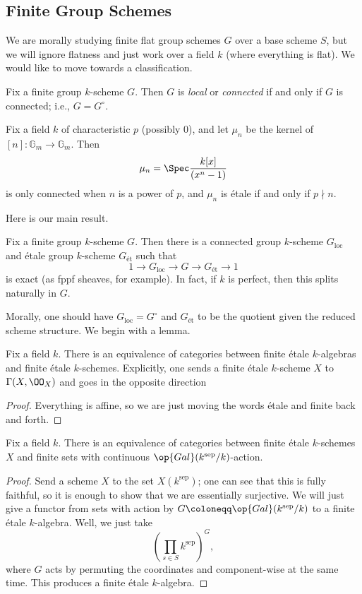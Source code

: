 \documentclass[../notes.tex]{subfiles}
\begin{document}
\subsection{Finite Group Schemes}
We are morally studying finite flat group schemes $G$ over a base scheme $S$, but we will ignore flatness and just work over a field $k$ (where everything is flat). We would like to move towards a classification.
\begin{definition}[connected]
	Fix a finite group $k$-scheme $G$. Then $G$ is \textit{local} or \textit{connected} if and only if $G$ is connected; i.e., $G=G^\circ$.
\end{definition}
\begin{example}
	Fix a field $k$ of characteristic $p$ (possibly $0$), and let $\mu_n$ be the kernel of $[n]\colon\mathbb G_m\to\mathbb G_m$. Then
	\[\mu_n=\Spec\frac{k[x]}{\left(x^n-1\right)}\]
	is only connected when $n$ is a power of $p$, and $\mu_n$ is \'etale if and only if $p\nmid n$.
\end{example}
Here is our main result.
\begin{proposition} \label{prop:split-finite-group-scheme}
	Fix a finite group $k$-scheme $G$. Then there is a connected group $k$-scheme $G_{\text{loc}}$ and \'etale group $k$-scheme $G_{\text{\'et}}$ such that
	\[1\to G_{\text{loc}}\to G\to G_{\text{\'et}}\to1\]
	is exact (as fppf sheaves, for example). In fact, if $k$ is perfect, then this splits naturally in $G$.
\end{proposition}
Morally, one should have $G_{\text{loc}}=G^\circ$ and $G_{\text{\'et}}$ to be the quotient given the reduced scheme structure. We begin with a lemma.
\begin{lemma}
	Fix a field $k$. There is an equivalence of categories between finite \'etale $k$-algebras and finite \'etale $k$-schemes. Explicitly, one sends a finite \'etale $k$-scheme $X$ to $\Gamma(X,\OO_X)$ and goes in the opposite direction
\end{lemma}
\begin{proof}
	Everything is affine, so we are just moving the words \'etale and finite back and forth.
\end{proof}
\begin{lemma}
	Fix a field $k$. There is an equivalence of categories between finite \'etale $k$-schemes $X$ and finite sets with continuous $\op{Gal}(k^{\mathrm{sep}}/k)$-action.
\end{lemma}
\begin{proof}
	Send a scheme $X$ to the set $X(k^{\mathrm{sep}})$; one can see that this is fully faithful, so it is enough to show that we are essentially surjective. We will just give a functor from sets with action by $G\coloneqq\op{Gal}(k^{\mathrm{sep}}/k)$ to a finite \'etale $k$-algebra. Well, we just take
	\[\left(\prod_{s\in S}k^{\mathrm{sep}}\right)^G,\]
	where $G$ acts by permuting the coordinates and component-wise at the same time. This produces a finite \'etale $k$-algebra.
\end{proof}
\end{document}
